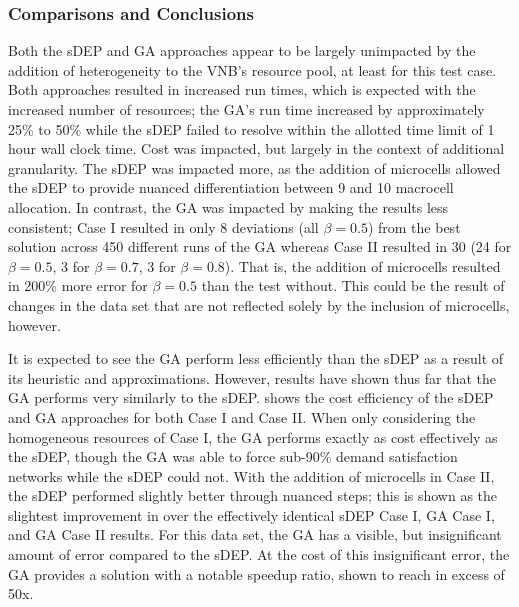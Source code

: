 \documentclass[12pt,dvipsnames]{report}
\begin{document}
\subsubsection{Comparisons and Conclusions}

Both the sDEP and GA approaches appear to be largely unimpacted by the addition of heterogeneity to the VNB's resource pool, at least for this test case.  Both approaches resulted in increased run times, which is expected with the increased number of resources; the GA's run time increased by approximately 25\% to 50\% while the sDEP failed to resolve within the allotted time limit of 1 hour wall clock time.  Cost was impacted, but largely in the context of additional granularity.  The sDEP was impacted more, as the addition of microcells allowed the sDEP to provide nuanced differentiation between 9 and 10 macrocell allocation.  In contrast, the GA was impacted by making the results less consistent; Case I resulted in only 8 deviations (all $\beta = 0.5$) from the best solution across 450 different runs of the GA whereas Case II resulted in 30 (24 for $\beta = 0.5$, 3 for $\beta = 0.7$, 3 for $\beta = 0.8$).  That is, the addition of microcells resulted in 200\% more error for $\beta = 0.5$ than the test without.  This could be the result of changes in the data set that are not reflected solely by the inclusion of microcells, however.

It is expected to see the GA perform less efficiently than the sDEP as a result of its heuristic and approximations.  However, results have shown thus far that the GA performs very similarly to the sDEP.   shows the cost efficiency of the sDEP and GA approaches for both Case I and Case II.  When only considering the homogeneous resources of Case I, the GA performs exactly as cost effectively as the sDEP, though the GA was able to force sub-90\% demand satisfaction networks while the sDEP could not.  With the addition of microcells in Case II, the sDEP performed slightly better through nuanced steps; this is shown as the slightest improvement in  over the effectively identical sDEP Case I, GA Case I, and GA Case II results.  For this data set, the GA has a visible, but insignificant amount of error compared to the sDEP.  At the cost of this insignificant error, the GA provides a solution with a notable speedup ratio, shown to reach in excess of 50x.
\end{document}

